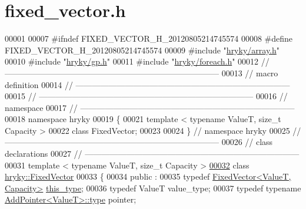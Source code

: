 \hypertarget{fixed__vector_8h_source}{\section{fixed\-\_\-vector.\-h}
}

\begin{DoxyCode}
00001 
00007 \textcolor{preprocessor}{#ifndef FIXED\_VECTOR\_H\_20120805214745574}
00008 \textcolor{preprocessor}{}\textcolor{preprocessor}{#define FIXED\_VECTOR\_H\_20120805214745574}
00009 \textcolor{preprocessor}{}\textcolor{preprocessor}{#include "\hyperlink{array_8h}{hryky/array.h}"}
00010 \textcolor{preprocessor}{#include "\hyperlink{gp_8h}{hryky/gp.h}"}
00011 \textcolor{preprocessor}{#include "\hyperlink{foreach_8h}{hryky/foreach.h}"}
00012 \textcolor{comment}{//
      ------------------------------------------------------------------------------}
00013 \textcolor{comment}{// macro definition}
00014 \textcolor{comment}{//
      ------------------------------------------------------------------------------}
00015 \textcolor{comment}{//
      ------------------------------------------------------------------------------}
00016 \textcolor{comment}{// namespace}
00017 \textcolor{comment}{//
      ------------------------------------------------------------------------------}
00018 \textcolor{keyword}{namespace }hryky
00019 \{
00021     \textcolor{keyword}{template} < \textcolor{keyword}{typename} ValueT, \textcolor{keywordtype}{size\_t} Capacity >
00022     \textcolor{keyword}{class }FixedVector;
00023 
00024 \} \textcolor{comment}{// namespace hryky}
00025 \textcolor{comment}{//
      ------------------------------------------------------------------------------}
00026 \textcolor{comment}{// class declarations}
00027 \textcolor{comment}{//
      ------------------------------------------------------------------------------}
00031 \textcolor{comment}{}\textcolor{keyword}{template} < \textcolor{keyword}{typename} ValueT, \textcolor{keywordtype}{size\_t} Capacity >
\hypertarget{fixed__vector_8h_source_l00032}{}\hyperlink{classhryky_1_1_fixed_vector}{00032} \textcolor{keyword}{class }\hyperlink{classhryky_1_1_fixed_vector}{hryky::FixedVector}
00033 \{
00034 \textcolor{keyword}{public} :
00035     \textcolor{keyword}{typedef} \hyperlink{classhryky_1_1_fixed_vector}{FixedVector<ValueT, Capacity>}                   \hyperlink{classhryky_1_1_fixed_vector}{this_type};
00036     \textcolor{keyword}{typedef} ValueT                                          value\_type;
00037     \textcolor{keyword}{typedef} \textcolor{keyword}{typename} \hyperlink{classhryky_1_1_add_pointer_a02d0c31ee76f5cb3f0ba3ca4c01fc8d3}{AddPointer<ValueT>::type}               pointer;

\end{DoxyCode}
